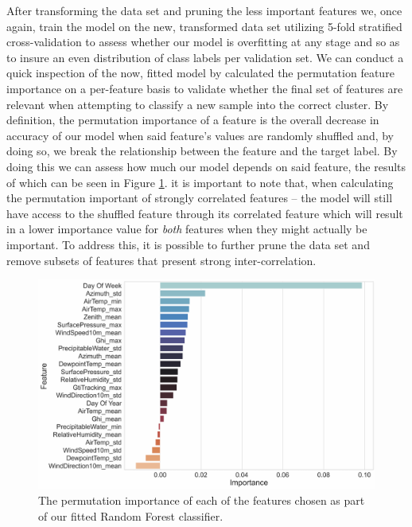\noindent \newline After transforming the data set and pruning the less important features we, once again, train the model on the new, transformed data set utilizing 5-fold stratified cross-validation to assess whether our model is overfitting at any stage and so as to insure an even distribution of class labels per validation set. We can conduct a quick inspection of the now, fitted model by calculated the permutation feature importance on a per-feature basis to validate whether the final set of features are relevant when attempting to classify a new sample into the correct cluster. By definition, the permutation importance of a feature is the overall decrease in accuracy of our model when said feature's values are randomly shuffled and, by doing so, we break the relationship between the feature and the target label. By doing this we can assess how much our model depends on said feature, the results of which can be seen in Figure \ref{fig:UCID-Classification-Permutation-Feature-Importance}. it is important to note that, when calculating the permutation important of strongly correlated features -- the model will still have access to the shuffled feature through its correlated feature which will result in a lower importance value for \textit{both} features when they might actually be important. To address this, it is possible to further prune the data set and remove subsets of features that present strong inter-correlation.

\begin{figure}[H]
    \centering
    \includegraphics[width=\textwidth]{Images/Chapter 6/Stage 4/UCID/UCID-Classification-Permutation-Importance.pdf}
    \caption{The permutation importance of each of the features chosen as part of our fitted Random Forest classifier.}
    \label{fig:UCID-Classification-Permutation-Feature-Importance}
\end{figure}

